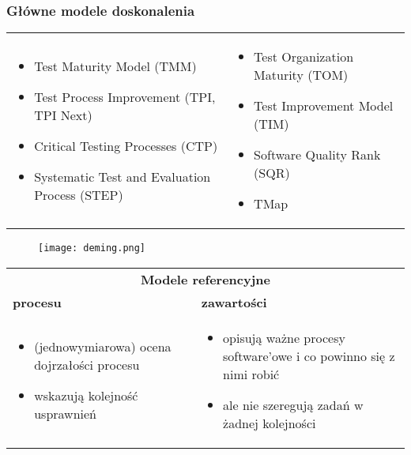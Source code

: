 \documentclass[../main.tex]{subfiles}
\begin{document}
    \subsubsection{Główne modele doskonalenia}
    \begin{table}[H]
        \begin{center}
            \begin{tabular}{p{8cm} p{8cm}}
                \begin{itemize}
                    \item Test Maturity Model (TMM)
                    \item Test Process Improvement (TPI, TPI Next)
                    \item Critical Testing Processes (CTP)
                    \item Systematic Test and Evaluation Process (STEP)
                \end{itemize}
                &
                \begin{itemize}
                    \item Test Organization Maturity (TOM)
                    \item Test Improvement Model (TIM)
                    \item Software Quality Rank (SQR)
                    \item TMap
                \end{itemize}
            \end{tabular}
        \end{center}
    \end{table}


    \begin{figure}[H]
        \texttt{[image: deming.png]}
    \end{figure}

    \begin{table}[H]
        \begin{center}
            \begin{tabular}{| p{8cm} | p{8cm} |}
                \hline
                \multicolumn{2}{|c|}{\textbf{Modele referencyjne}} \\
                \textbf{procesu} & \textbf{zawartości} \\
                \hline
                \begin{itemize}
                    \item (jednowymiarowa) ocena dojrzałości procesu
                    \item wskazują kolejność usprawnień
                \end{itemize}
                &
                \begin{itemize}
                    \item opisują ważne procesy software’owe i co powinno się z nimi robić
                    \item ale nie szeregują zadań w żadnej kolejności
                \end{itemize} \\
                \hline
            \end{tabular}
        \end{center}
    \end{table}
\end{document}
